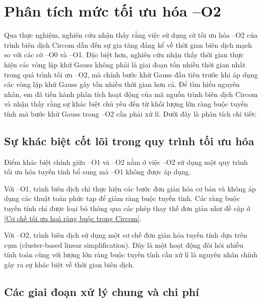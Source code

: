 \section{Phân tích mức tối ưu hóa --O2}

Qua thực nghiệm, nghiên cứu nhận thấy rằng việc sử dụng cờ tối ưu hóa --O2 của trình biên dịch Circom dẫn đến sự gia tăng đáng kể về thời gian biên dịch mạch so với các cờ --O0 và --O1. Đặc biệt hơn, nghiên cứu nhận thấy thời gian thực hiện các vòng lặp khử Gauss không phải là giai đoạn tốn nhiều thời gian nhất trong quá trình tối ưu --O2, mà chính bước khử Gauss đầu tiên trước khi áp dụng các vòng lặp khử Gauss gây tốn nhiều thời gian hơn cả. Để tìm hiểu nguyên nhân, em đã tiến hành phân tích hoạt động của mã nguồn trình biên dịch Circom và nhận thấy rằng sự khác biệt chủ yếu đến từ khối lượng lớn ràng buộc tuyến tính mà bước khử Gauss trong --O2 cần phải xử lí. Dưới đây là phân tích chi tiết:

\subsection{Sự khác biệt cốt lõi trong quy trình tối ưu hóa}

Điểm khác biệt chính giữa --O1 và --O2 nằm ở việc --O2 sử dụng một quy trình tối ưu hóa tuyến tính bổ sung mà --O1 không được áp dụng. 

Với --O1, trình biên dịch chỉ thực hiện các bước đơn giản hóa cơ bản và không áp dụng các thuật toán phức tạp để giảm ràng buộc tuyến tính. Các ràng buộc tuyến tính chỉ được loại bỏ thông qua các phép thay thế đơn giản như đề cập ở \ref{Cơ chế tối ưu hoá ràng buộc trong Circom}. 

Với --O2, trình biên dịch sử dụng một cơ chế đơn giản hóa tuyến tính dựa trên cụm (cluster-based linear simplification). Đây là một hoạt động đòi hỏi nhiều tính toán cùng với lượng lớn ràng buộc tuyến tính cần xử lí là nguyên nhân chính gây ra sự khác biệt về thời gian biên dịch.

\subsection{Các giai đoạn xử lý chung và chi phí}



